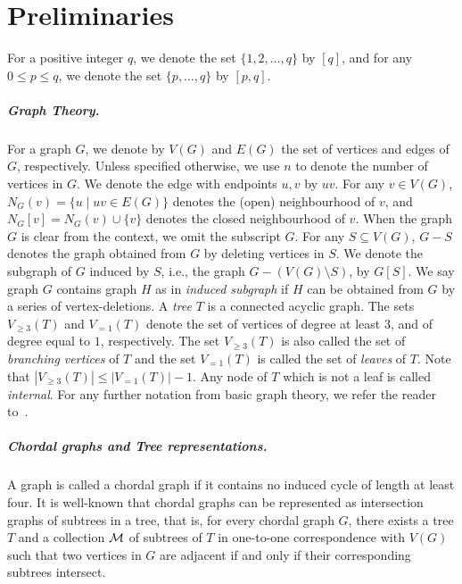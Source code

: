 \section{Preliminaries}
\label{prelims}

For a positive integer $q$, we denote the set $\{1, 2, \dots, q\}$ by $[q]$,
and for any $0 \leq p \leq q$, we denote the set $\{p,\dots,q\}$ by $[p,q]$.


\subparagraph*{Graph Theory.}
For a graph $G$, we denote by $V(G)$ and $E(G)$
the set of vertices and edges of $G$, respectively.
Unless specified otherwise, we use $n$ to denote the number of vertices in $G$.
{We denote the edge with endpoints $u, v$ by $uv$}.
For any $v \in V(G)$,
$N_G(v) = \{u \mid uv \in E(G)\}$ denotes the (open) neighbourhood of $v$,
and $N_G[v]=N_G (v) \cup \{v\}$ denotes the closed neighbourhood of $v$.
When the graph $G$ is clear from the context, we omit the subscript $G$.
For any $S \subseteq V(G)$, $G - S$ denotes the graph obtained from $G$ by deleting vertices in $S$.
We denote the subgraph of $G$ induced by $S$, i.e., the graph $G - (V(G) \setminus S)$, by $G[S]$.
We say graph $G$ contains graph $H$ as in \emph{induced subgraph}
if $H$ can be obtained from $G$ by a series of vertex-deletions. A {\em tree} $T$ is a connected acyclic graph. The sets $V_{\geq 3}(T)$ and $V_{=1}(T)$
denote the set of vertices of degree at least $3$,
and of degree equal to $1$, respectively.
The set $V_{\geq 3}(T)$ is also called the set of {\em branching vertices} of $T$
and the set $V_{=1}(T)$ is called the set of {\em leaves} of $T$.
Note that $|V_{\geq 3}(T)| \le |V_{=1}(T)|-1$.
Any node of $T$ which is not a leaf is called \emph{internal}.
For any further notation from basic graph theory, we refer the reader to~\cite{DBLP:books/daglib/Diestel12}.



\subparagraph*{Chordal graphs and Tree representations.}
A graph is called a chordal graph if it contains no induced cycle of length at least four.
It is well-known that chordal graphs can be represented as intersection graphs of subtrees in a tree, that is, 
for every chordal graph $G$, there exists a tree $T$ and a collection ${\mathcal M}$ of subtrees of $T$ 
in one-to-one correspondence with $V(G)$ 
such that two vertices in $G$ are adjacent if and only if their corresponding subtrees intersect.

